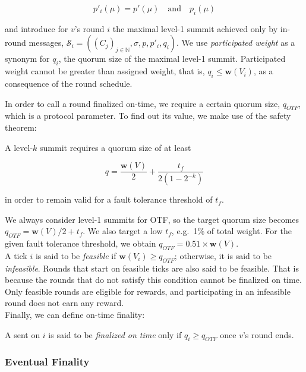 \begin{equation}
  p'_{i}(\mu) = p'(\mu)\quad\text{and}\quad p_{i}(\mu)
\end{equation}

and introduce for $v$'s round $i$ the maximal level-1 summit achieved only by in-round messages, $\mathcal{S}_{i}=((C_j)_{j\in\mathbb{N}}, \sigma,p,p'_{i},q_{i})$. We use \emph{participated weight} as a synonym for $q_{i}$, the quorum size of the maximal level-1 summit. Participated weight cannot be greater than assigned weight, that is, $q_{i} \leq \boldsymbol{w}(V_i)$, as a consequence of the round schedule.

In order to call a round finalized on-time, we require a certain quorum size, $q_{OTF}$, which is a protocol parameter. To find out its value, we make use of the safety theorem:

\begin{theorem}
  A level-$k$ summit requires a quorum size of at least

  \begin{equation}
    q = \frac{\boldsymbol{w}(V)}{2} + \frac{t_f}{2(1-2^{-k})}
  \end{equation}

  in order to remain valid for a fault tolerance threshold of $t_f$.
\end{theorem}
%
We always consider level-1 summits for OTF, so the target quorum size becomes $q_{OTF}=\boldsymbol{w}(V)/2+t_f$. We also target a low $t_f$, e.g.~1\% of total weight. For the given fault tolerance threshold, we obtain $q_{OTF} = 0.51 \times \boldsymbol{w}(V)$.
%
\\A tick $i$ is said to be \emph{feasible} if $\boldsymbol{w}(V_i)\geq q_{OTF}$; otherwise, it is said to be \emph{infeasible}. Rounds that start on feasible ticks are also said to be feasible. That is because the rounds that do not satisfy this condition cannot be finalized on time. Only feasible rounds are eligible for rewards, and participating in an infeasible round does not earn any reward.
%
\\Finally, we can define on-time finality:
%
\begin{definition}
  A \PROP sent on $i$ is said to be \emph{finalized on time} only if $q_{i} \geq q_{OTF}$ once $v$'s round ends.
\end{definition}

\subsubsection*{Eventual Finality}
\label{sec:eventual-finality}

